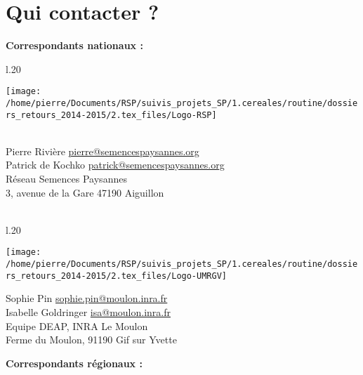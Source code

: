 \chapter*{Qui contacter ?}

\vfill

\noindent\textbf{\textsf{Correspondants nationaux :}} \\

\begin{wrapfigure}{l}{.20\textwidth}
\begin{center} \vspace{-20pt}
\texttt{[image: /home/pierre/Documents/RSP/suivis\_projets\_SP/1.cereales/routine/dossiers\_retours\_2014-2015/2.tex\_files/Logo-RSP]}
\end{center} \vspace{-20pt}
\end{wrapfigure}
\noindent
~\\
Pierre Rivière \href{mailto:pierre@semencespaysannes.org}{pierre@semencespaysannes.org} \\
Patrick de Kochko \href{mailto:patrick@semencespaysannes.org}{patrick@semencespaysannes.org} \\
Réseau Semences Paysannes \\
3, avenue de la Gare 47190 Aiguillon \\
~\\

\vfill

\begin{wrapfigure}{l}{.20\textwidth}
\begin{center} \vspace{-20pt}
\texttt{[image: /home/pierre/Documents/RSP/suivis\_projets\_SP/1.cereales/routine/dossiers\_retours\_2014-2015/2.tex\_files/Logo-UMRGV]}
\end{center} \vspace{-20pt}
\end{wrapfigure}
\noindent
Sophie Pin \href{mailto:sophie.pin@moulon.inra.fr}{sophie.pin@moulon.inra.fr} \\
Isabelle Goldringer \href{mailto:isa@moulon.inra.fr}{isa@moulon.inra.fr} \\
Equipe DEAP, INRA Le Moulon  \\
Ferme du Moulon, 91190 Gif sur Yvette \\

\vfill

\newpage

\noindent\textbf{\textsf{Correspondants régionaux :}} \\

